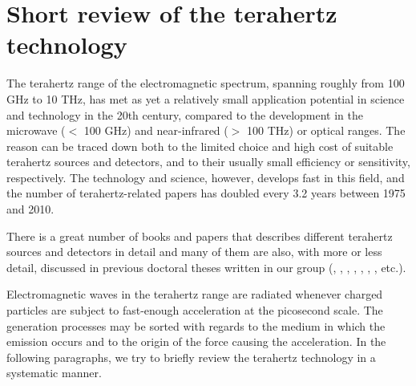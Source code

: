 \section{Short review of the terahertz technology}
The terahertz range of the electromagnetic spectrum, spanning roughly from 100 GHz to 10 THz, has met as yet a relatively small application potential in science and technology in the 20th century, compared to the development in the microwave ($<$ 100 GHz) and near-infrared ($>$ 100 THz) or optical ranges. The reason can be traced down both to the limited choice and high cost of suitable terahertz sources and detectors, and to their usually small efficiency or sensitivity, respectively. The technology and science, however, develops fast in this field, and the number of terahertz-related papers has doubled every 3.2 years \cite{lewis2014review} between 1975 and 2010.  %

There is a great number of books and papers that describes different terahertz sources and detectors in detail \cite[pp. 155-158]{lee2008book}\cite{sullivan2012field,lewis2014review}
and many of them are also, with more or less detail, discussed in previous doctoral theses written in our group (\cite[pp. 2-30]{pashkin2004phd}, \cite[pp. 19-25]{nemec2006phd}, \cite[pp. 7-26]{fekete2008phd}, \cite[pp. 11-21]{sibik2010dp}, \cite[pp. 31-45]{yahiaoui2011phd}, \cite[pp. 33-38]{mics2012phd}, \cite[pp. 25-33]{skoromets2013phd}, etc.).

Electromagnetic waves in the terahertz range are radiated whenever charged particles are subject to fast-enough acceleration at the picosecond scale. 
The generation processes may be sorted with regards to the medium in which the emission occurs and to the origin of the force causing the acceleration.  
In the following paragraphs, we try to briefly review the terahertz technology in a systematic manner.

